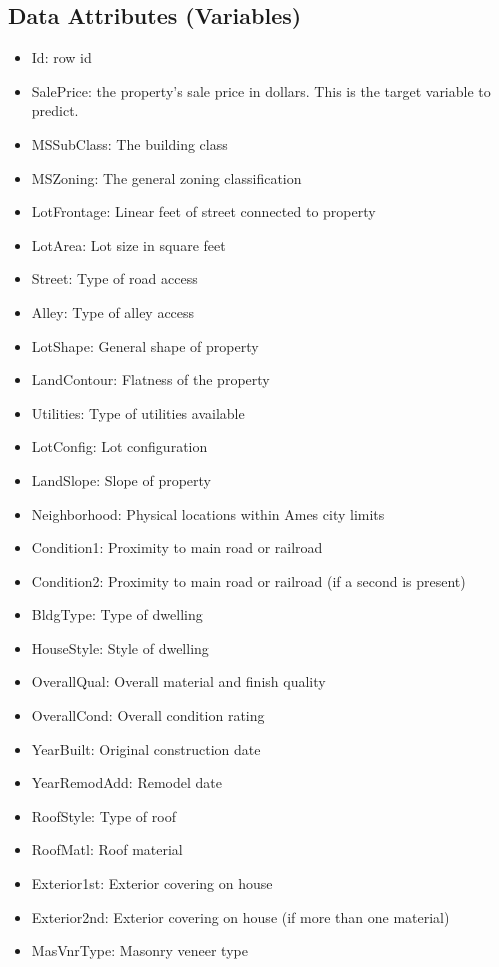 \documentclass[sigconf]{acmart}
\begin{document}
	\subsection{Data Attributes (Variables)}

	
	\begin{itemize}
		\item Id: row id
		\item SalePrice: the property's sale price in dollars. This is the target variable to predict.
		\item MSSubClass: The building class
		\item MSZoning: The general zoning classification
		\item LotFrontage: Linear feet of street connected to property
		\item LotArea: Lot size in square feet
		\item Street: Type of road access
		\item Alley: Type of alley access
		\item LotShape: General shape of property
		\item LandContour: Flatness of the property
		\item Utilities: Type of utilities available
		\item LotConfig: Lot configuration
		\item LandSlope: Slope of property
		\item Neighborhood: Physical locations within Ames city limits
		\item Condition1: Proximity to main road or railroad
		\item Condition2: Proximity to main road or railroad (if a second is present)
		\item BldgType: Type of dwelling
		\item HouseStyle: Style of dwelling
		\item OverallQual: Overall material and finish quality
		\item OverallCond: Overall condition rating
		\item YearBuilt: Original construction date
		\item YearRemodAdd: Remodel date
		\item RoofStyle: Type of roof
		\item RoofMatl: Roof material
		\item Exterior1st: Exterior covering on house
		\item Exterior2nd: Exterior covering on house (if more than one material)
		\item MasVnrType: Masonry veneer type

\end{itemize}
\end{document}
